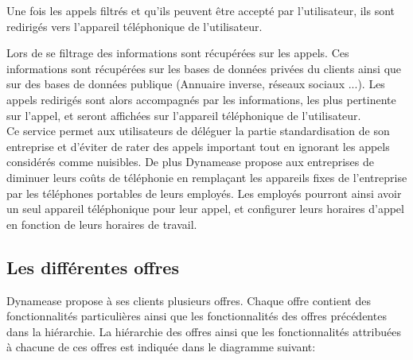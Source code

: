 Une fois les appels filtrés et qu'ils peuvent être accepté par l'utilisateur, ils sont redirigés vers l'appareil téléphonique de l'utilisateur.

Lors de se filtrage des informations sont récupérées sur les appels. Ces informations sont récupérées sur les bases de données privées du clients ainsi que sur des bases de données publique (Annuaire inverse, réseaux sociaux ...). Les appels redirigés sont alors accompagnés par les informations, les plus pertinente sur l'appel, et seront affichées sur l'appareil téléphonique de l'utilisateur.\\

Ce service permet aux utilisateurs de déléguer la partie standardisation de son entreprise et d'éviter de rater des appels important tout en ignorant les appels considérés comme nuisibles. De plus Dynamease propose aux entreprises de diminuer leurs coûts de téléphonie en remplaçant les appareils fixes de l'entreprise par les téléphones portables de leurs employés. Les employés pourront ainsi avoir un seul appareil téléphonique pour leur appel, et configurer leurs horaires d'appel en fonction de leurs horaires de travail.

\subsection{Les différentes offres}

Dynamease propose à ses clients plusieurs offres. Chaque offre contient des fonctionnalités particulières ainsi que les fonctionnalités des offres précédentes dans la hiérarchie.  La hiérarchie des offres ainsi que les fonctionnalités attribuées à chacune de ces offres est indiquée dans le diagramme suivant:

